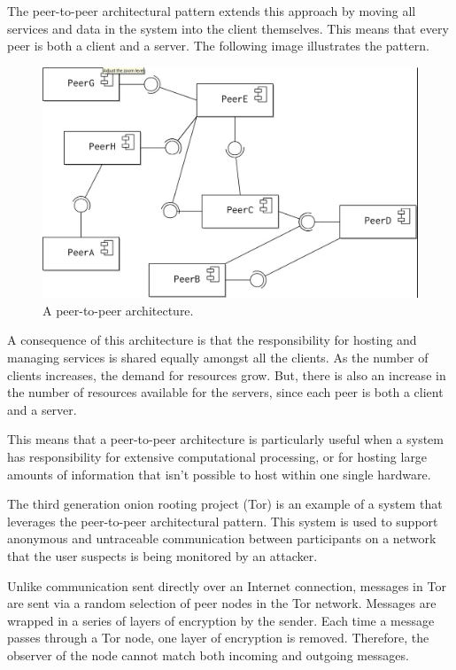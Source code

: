\documentclass[a4paper, openany]{memoir}
\begin{document}
The peer-to-peer architectural pattern extends this approach by moving all services and data in the system into the client themselves. This means that every peer is both a client and a server. The following image illustrates the pattern.
\begin{figure}[H]
    \centering
    \includegraphics[scale=0.35]{src/14.6 Peer to peer.png}
    \caption{A peer-to-peer architecture.}
\end{figure}

A consequence of this architecture is that the responsibility for hosting and managing services is shared equally amongst all the clients. As the number of clients increases, the demand for resources grow. But, there is also an increase in the number of resources available for the servers, since each peer is both a client and a server.

This means that a peer-to-peer architecture is particularly useful when a system has responsibility for extensive computational processing, or for hosting large amounts of information that isn't possible to host within one single hardware.

The third generation onion rooting project (Tor) is an example of a system that leverages the peer-to-peer architectural pattern. This system is used to support anonymous and untraceable communication between participants on a network that the user suspects is being monitored by an attacker. 

Unlike communication sent directly over an Internet connection, messages in Tor are sent via a random selection of peer nodes in the Tor network. Messages are wrapped in a series of layers of encryption by the sender. Each time a message passes through a Tor node, one layer of encryption is removed. Therefore, the observer of the node cannot match both incoming and outgoing messages. 
\end{document}
